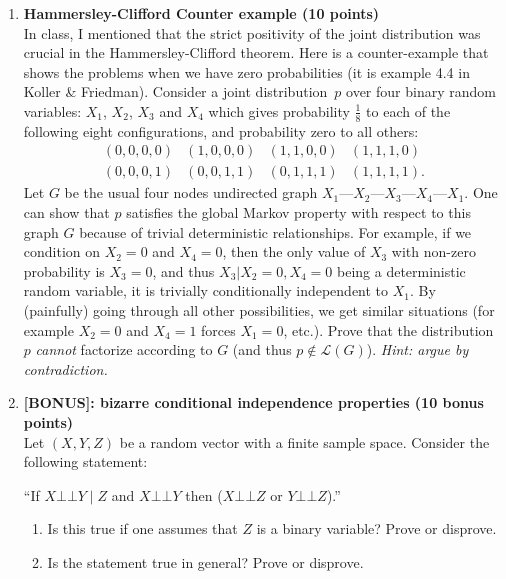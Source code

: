 \documentclass[12pt]{article}
\newcommand{\BNUM}{\begin{enumerate}}
\newcommand{\ENUM}{\end{enumerate}}
\newcommand{\1}{{\bf 1}}
\newcommand{\indep}{\bot\!\!\!\bot}
\begin{document}
\begin{enumerate}
\vspace{0.2cm}

\item {\bf Hammersley-Clifford Counter example (10 points)} \\
In class, I mentioned that the strict positivity of the joint distribution was crucial in the Hammersley-Clifford theorem. Here is a counter-example that shows the problems when we have zero probabilities (it is example 4.4 in Koller \& Friedman). Consider a joint distribution~$p$ over four binary random
variables: $X_1$, $X_2$, $X_3$ and $X_4$ which gives probability
$\frac{1}{8}$ to each of the following eight configurations, and
probability zero to all others:
\[
\begin{array}{cccc}
(0,0,0,0) & (1,0,0,0) & (1,1,0,0) & (1,1,1,0) \\
(0,0,0,1) & (0,0,1,1) & (0,1,1,1) & (1,1,1,1) .
\end{array}
\]
Let $G$ be the usual four nodes undirected graph
$X_{1}\text{---}X_{2}\text{---}X_{3}\text{---}X_{4}\text{---}X_{1}$. One can show that $p$ satisfies the 
global Markov property with respect to this graph $G$ because of trivial deterministic relationships. For example, if we condition on $X_2 = 0$ and $X_4=0$, then the only value of $X_3$ with non-zero probability is $X_3 = 0$, and thus $X_3 | X_2=0 ,X_4=0$ being a deterministic random variable, it is trivially conditionally independent to $X_1$. By (painfully) going through all other possibilities, we get similar situations (for example $X_2=0$ and $X_4=1$ forces $X_1 = 0$, etc.). Prove that the
distribution $p$ \emph{cannot} factorize according to $G$ (and thus $p \notin \mathcal{L}(G)$). \emph{Hint: argue by contradiction.}

\vspace{0.2cm}

\item {\bf [BONUS]: bizarre conditional independence properties (10 bonus points)} \\ 
Let $(X,Y,Z)$ be a random vector with a finite sample space. Consider the following statement: 
\begin{center}
``If  $X \indep Y \mid Z$ and $X \indep Y$ then ($X \indep Z$ or $Y \indep Z$).''
\end{center}
\BNUM
\item Is this true if one assumes that $Z$ is a binary variable? Prove or disprove.
\item Is the statement true in general? Prove or disprove.
\ENUM 



\end{enumerate}
\end{document}
